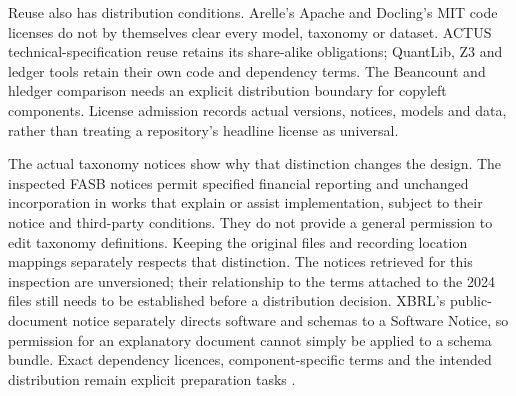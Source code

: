Reuse also has distribution conditions. Arelle's Apache and Docling's MIT code
licenses do not by themselves clear every model, taxonomy or dataset. ACTUS
technical-specification reuse retains its share-alike obligations; QuantLib,
Z3 and ledger tools retain their own code and dependency terms. The Beancount
and hledger comparison needs an explicit distribution boundary for copyleft
components. License admission records actual versions, notices, models and
data, rather than treating a repository's headline license as universal.

The actual taxonomy notices show why that distinction changes the design.
The inspected FASB notices permit specified financial reporting and unchanged
incorporation in works that explain or assist implementation, subject to their
notice and third-party conditions. They do not provide a general permission to
edit taxonomy definitions. Keeping the original files and recording location
mappings separately respects that distinction. The notices retrieved for this
inspection are unversioned; their relationship to the terms attached to the
2024 files still needs to be established before a distribution decision.
XBRL's public-document notice separately directs software and schemas to a
Software Notice, so permission for an explanatory document cannot simply be
applied to a schema bundle. Exact dependency licences, component-specific terms
and the intended distribution remain explicit preparation tasks
\citep{fasbtaxonomyuses,fasbsrtuses,xbrlcopyright}.
